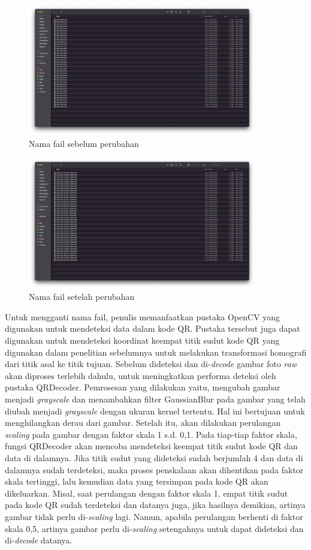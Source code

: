\begin{figure}[h]
	\centering
	\includegraphics[width=10cm]{contents/chapter-3/3-namafile1.png}
	\caption{Nama fail sebelum perubahan}
	\label{Fig: 3-namafile1}
\end{figure}

\begin{figure}[h]
	\centering
	\includegraphics[width=10cm]{contents/chapter-3/3-namafile2.png}
	\caption{Nama fail setelah perubahan}
	\label{Fig: 3-namafile2}
\end{figure}

Untuk mengganti nama fail, penulis memanfaatkan pustaka OpenCV yang digunakan untuk mendeteksi data dalam kode QR. Pustaka tersebut juga dapat digunakan untuk
mendeteksi koordinat keempat titik sudut kode QR yang digunakan dalam penelitian sebelumnya untuk melakukan transformasi homografi dari titik asal ke titik
tujuan. Sebelum dideteksi dan di-\emph{decode} gambar foto \emph{raw} akan diproses terlebih dahulu, untuk meningkatkan performa deteksi oleh pustaka
QRDecoder. Pemrosesan yang dilakukan yaitu, mengubah gambar menjadi \emph{grayscale} dan menambahkan filter GaussianBlur pada gambar yang telah diubah menjadi
\emph{grayscale} dengan ukuran kernel tertentu. Hal ini bertujuan untuk menghilangkan derau dari gambar. Setelah itu, akan dilakukan perulangan \emph{scaling}
pada gambar dengan faktor skala 1 s.d. 0,1. Pada tiap-tiap faktor skala, fungsi QRDecoder akan mencoba mendeteksi keempat titik sudut kode QR dan data di
dalamnya. Jika titik sudut yang dideteksi sudah berjumlah 4 dan data di dalamnya sudah terdeteksi, maka proses penskalaan akan dihentikan pada faktor skala
tertinggi, lalu kemudian data yang tersimpan pada kode QR akan dikeluarkan. Misal, saat perulangan dengan faktor skala 1, empat titik sudut pada kode QR sudah
terdeteksi dan datanya juga, jika hasilnya demikian, artinya gambar tidak perlu di-\emph{scaling} lagi. Namun, apabila perulangan berhenti di faktor skala 0,5,
artinya gambar perlu di-\emph{scaling} setengahnya untuk dapat dideteksi dan di-\emph{decode} datanya.

